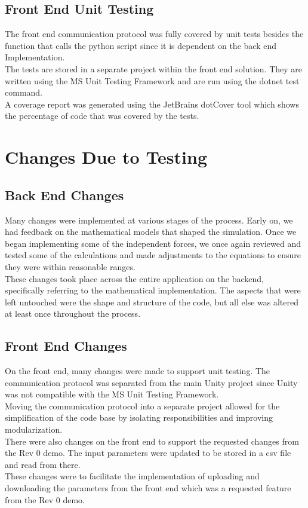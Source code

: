 \documentclass[12pt, titlepage]{article}
\begin{document}
\subsection{Front End Unit Testing}
The front end communication protocol was fully covered by unit tests besides the function that calls the python script since it is dependent on the back end Implementation.
\\
The tests are stored in a separate project within the front end solution. They are written using the MS Unit Testing Framework and are run using the dotnet test command.
\\
A coverage report was generated using the JetBrains dotCover tool which shows the percentage of code that was covered by the tests.  

\section{Changes Due to Testing}

\subsection{Back End Changes}
Many changes were implemented at various stages of the process. Early on, we had feedback on the mathematical models that shaped the simulation. Once we began implementing some of the independent forces, we once again reviewed and tested some of the calculations and made adjustments to the equations to ensure they were within reasonable ranges. \\

These changes took place across the entire application on the backend, specifically referring to the mathematical implementation. The aspects that were left untouched were the shape and structure of the code, but all else was altered at least once throughout the process. \\

\subsection{Front End Changes}
On the front end, many changes were made to support unit testing. The communication protocol was separated from the main Unity project since Unity was not compatible with the MS Unit Testing Framework.
\\
Moving the communication protocol into a separate project allowed for the simplification of the code base by isolating responsibilities and improving modularization.
\\
There were also changes on the front end to support the requested changes from the Rev 0 demo. The input parameters were updated to be stored in a csv file and read from there.
\\
These changes were to facilitate the implementation of uploading and downloading the parameters from the front end which was a requested feature from the Rev 0 demo.
\end{document}
